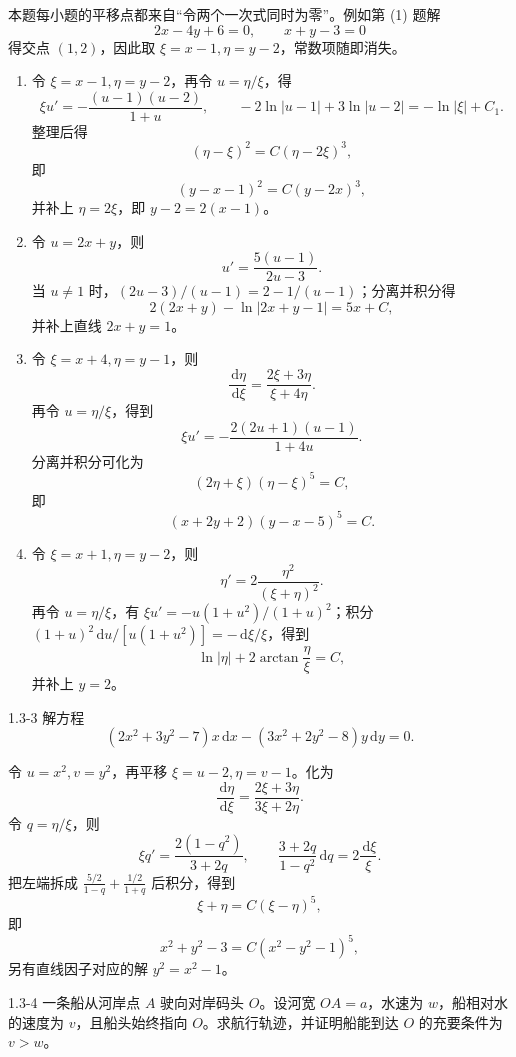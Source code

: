\documentclass[UTF8,a4paper,11pt]{ctexart}
\newcommand{\dd}{\,\mathrm d}
\begin{document}
\begin{solution}
本题每小题的平移点都来自“令两个一次式同时为零”。例如第 (1) 题解
\[
2x-4y+6=0,\qquad x+y-3=0
\]
得交点 $(1,2)$，因此取 $\xi=x-1,\eta=y-2$，常数项随即消失。
\begin{enumerate}[label=(\arabic*)]
\item 令 $\xi=x-1,\eta=y-2$，再令 $u=\eta/\xi$，得
\[
\xi u'=-\frac{(u-1)(u-2)}{1+u},
\qquad
-2\ln|u-1|+3\ln|u-2|=-\ln|\xi|+C_1.
\]
整理后得
\[
\boxed{(\eta-\xi)^2=C(\eta-2\xi)^3},
\]
即
\[
\boxed{(y-x-1)^2=C(y-2x)^3},
\]
并补上 $\eta=2\xi$，即 $\boxed{y-2=2(x-1)}$。
\item 令 $u=2x+y$，则
\[
u'=\frac{5(u-1)}{2u-3}.
\]
当 $u\ne1$ 时，$(2u-3)/(u-1)=2-1/(u-1)$；分离并积分得
\[
\boxed{2(2x+y)-\ln|2x+y-1|=5x+C},
\]
并补上直线 $\boxed{2x+y=1}$。
\item 令 $\xi=x+4,\eta=y-1$，则
\[
\frac{\dd\eta}{\dd\xi}=\frac{2\xi+3\eta}{\xi+4\eta}.
\]
再令 $u=\eta/\xi$，得到
\[
\xi u'=-\frac{2(2u+1)(u-1)}{1+4u}.
\]
分离并积分可化为
\[
\boxed{(2\eta+\xi)(\eta-\xi)^5=C},
\]
即
\[
\boxed{(x+2y+2)(y-x-5)^5=C}.
\]
\item 令 $\xi=x+1,\eta=y-2$，则
\[
\eta'=2\frac{\eta^2}{(\xi+\eta)^2}.
\]
再令 $u=\eta/\xi$，有
$\xi u'=-u(1+u^2)/(1+u)^2$；积分
$(1+u)^2\dd u/[u(1+u^2)]=-\dd\xi/\xi$，得到
\[
\boxed{\ln|\eta|+2\arctan\frac{\eta}{\xi}=C},
\]
并补上 $\boxed{y=2}$。
\end{enumerate}
\end{solution}

\begin{problem}{1.3-3}
解方程
  \[
    (2x^2+3y^2-7)x\dd x-(3x^2+2y^2-8)y\dd y=0.
  \]
\end{problem}

\begin{solution}
令 $u=x^2,v=y^2$，再平移 $\xi=u-2,\eta=v-1$。化为
\[
\frac{\dd\eta}{\dd\xi}=\frac{2\xi+3\eta}{3\xi+2\eta}.
\]
令 $q=\eta/\xi$，则
\[
\xi q'=\frac{2(1-q^2)}{3+2q},\qquad
\frac{3+2q}{1-q^2}\dd q=2\frac{\dd\xi}{\xi}.
\]
把左端拆成 $\frac{5/2}{1-q}+\frac{1/2}{1+q}$ 后积分，得到
\[
\boxed{\xi+\eta=C(\xi-\eta)^5},
\]
即
\[
\boxed{x^2+y^2-3=C(x^2-y^2-1)^5},
\]
另有直线因子对应的解 $\boxed{y^2=x^2-1}$。
\end{solution}

\begin{problem}{1.3-4}
一条船从河岸点 $A$ 驶向对岸码头 $O$。设河宽 $OA=a$，水速为 $w$，船相对水的速度为 $v$，且船头始终指向 $O$。求航行轨迹，并证明船能到达 $O$ 的充要条件为 $v>w$。
\end{problem}
\end{document}

